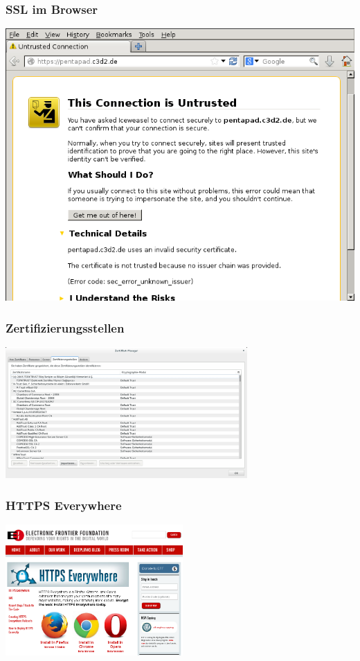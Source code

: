 \documentclass[12pt]{beamer}
\begin{document}
\begin{frame}
    \frametitle{SSL im Browser}
    \includegraphics[height=0.7\textheight]{img/ssl_unverified.png}
\end{frame}

\begin{frame}
    \frametitle{Zertifizierungsstellen}
    \begin{center}
      \includegraphics[height=5cm]{img/zertifikate.png}
    \end{center}
\end{frame}

\begin{frame}
  \frametitle{HTTPS Everywhere}
    \begin{center}
      \includegraphics[height=5cm]{img/https-everywhere.png}
    \end{center}
\end{frame}
\end{document}
